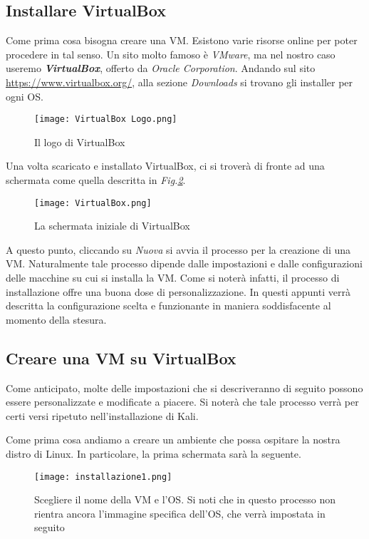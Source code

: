 \documentclass[14pt]{extreport}
\begin{document}
\subsection{Installare VirtualBox}
Come prima cosa bisogna creare una VM. Esistono varie risorse online per poter procedere in tal senso. Un sito molto famoso è \textit{VMware}, ma nel nostro caso useremo \textbf{\textit{VirtualBox}}, offerto da \textit{Oracle Corporation}.
Andando sul sito \url{https://www.virtualbox.org/}, alla sezione \textit{Downloads} si trovano gli installer per ogni OS.

\begin{figure}[H]
    \centering
    \texttt{[image: VirtualBox Logo.png]}
    \caption{Il logo di VirtualBox}
    \label{vblogo}
\end{figure}

Una volta scaricato e installato VirtualBox, ci si troverà di fronte ad una schermata come quella descritta in \textit{Fig.\ref{vbintro}}.

\begin{figure}[H]
    \centering
    \texttt{[image: VirtualBox.png]}
    \caption{La schermata iniziale di VirtualBox}
    \label{vbintro}
\end{figure}

A questo punto, cliccando su \textit{Nuova} si avvia il processo per la creazione di una VM. Naturalmente tale processo dipende dalle impostazioni e dalle configurazioni delle macchine su cui si installa la VM. Come si noterà infatti, il processo di installazione offre una buona dose di personalizzazione. In questi appunti verrà descritta la configurazione scelta e funzionante in maniera soddisfacente al momento della stesura.

\subsection{Creare una VM su VirtualBox}
Come anticipato, molte delle impostazioni che si descriveranno di seguito possono essere personalizzate e modificate a piacere. Si noterà che tale processo verrà per certi versi ripetuto nell'installazione di Kali.\newline

Come prima cosa andiamo a creare un ambiente che possa ospitare la nostra distro di Linux. In particolare, la prima schermata sarà la seguente.

\begin{figure}[H]
    \centering
    \texttt{[image: installazione1.png]}
    \caption{Scegliere il nome della VM e l'OS. Si noti che in questo processo non rientra ancora l'immagine specifica dell'OS, che verrà impostata in seguito}
    \label{vbinsta1}
\end{figure}
\end{document}
